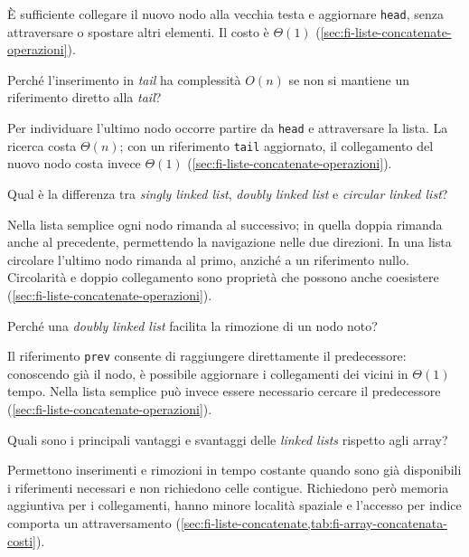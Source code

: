È sufficiente collegare il nuovo nodo alla vecchia testa e aggiornare
\texttt{head}, senza attraversare o spostare altri elementi. Il costo è
\(\Theta(1)\) (\cref{sec:fi-liste-concatenate-operazioni}).

\begin{exercise}
\label{ex:fi-esercizi-strutture-dati-inserimento-tail-senza-riferimento}
Perché l'inserimento in \emph{tail} ha complessità \(O(n)\) se non si mantiene
un riferimento diretto alla \emph{tail}?
\end{exercise}

Per individuare l'ultimo nodo occorre partire da \texttt{head} e attraversare la
lista. La ricerca costa \(\Theta(n)\); con un riferimento \texttt{tail}
aggiornato, il collegamento del nuovo nodo costa invece \(\Theta(1)\)
(\cref{sec:fi-liste-concatenate-operazioni}).

\begin{exercise}
\label{ex:fi-esercizi-strutture-dati-varianti-linked-list}
Qual è la differenza tra \emph{singly linked list}, \emph{doubly linked list} e
\emph{circular linked list}?
\end{exercise}

Nella lista semplice ogni nodo rimanda al successivo; in quella doppia rimanda
anche al precedente, permettendo la navigazione nelle due direzioni. In una
lista circolare l'ultimo nodo rimanda al primo, anziché a un riferimento nullo.
Circolarità e doppio collegamento sono proprietà che possono anche coesistere
(\cref{sec:fi-liste-concatenate-operazioni}).

\begin{exercise}
\label{ex:fi-esercizi-strutture-dati-doubly-rimozione-nodo}
Perché una \emph{doubly linked list} facilita la rimozione di un nodo noto?
\end{exercise}

Il riferimento \texttt{prev} consente di raggiungere direttamente il
predecessore: conoscendo già il nodo, è possibile aggiornare i collegamenti dei
vicini in \(\Theta(1)\) tempo. Nella lista semplice può invece essere necessario
cercare il predecessore (\cref{sec:fi-liste-concatenate-operazioni}).

\begin{exercise}
\label{ex:fi-esercizi-strutture-dati-linked-vantaggi-svantaggi}
Quali sono i principali vantaggi e svantaggi delle \emph{linked lists} rispetto
agli array?
\end{exercise}

Permettono inserimenti e rimozioni in tempo costante quando sono già disponibili
i riferimenti necessari e non richiedono celle contigue. Richiedono però memoria
aggiuntiva per i collegamenti, hanno minore località spaziale e l'accesso per
indice comporta un attraversamento
(\cref{sec:fi-liste-concatenate,tab:fi-array-concatenata-costi}).

